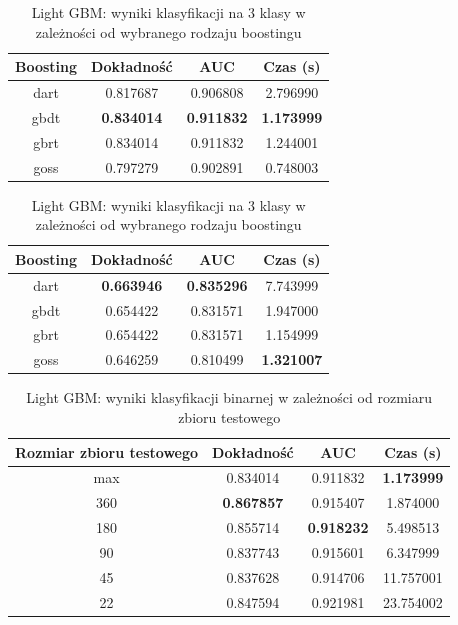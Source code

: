\documentclass[a4paper, twoside, 11pt, openright]{article}
\begin{document}
\begin{table}[H]
    \centering
    \begin{tabular}{|c|c|c|c|}
    \hline
        \textbf{Boosting} & \textbf{Dokładność} & \textbf{AUC} & \textbf{Czas (s)} \\ \hline
dart     &  0.817687 &  0.906808 &    2.796990 \\ \hline
gbdt     &  \textbf{0.834014} &  \textbf{0.911832} &    \textbf{1.173999} \\ \hline
gbrt     &  0.834014 &  0.911832 &    1.244001 \\ \hline
goss     &  0.797279 &  0.902891 &    0.748003 \\ \hline
    \end{tabular}
    \caption{Light GBM: wyniki klasyfikacji na 3 klasy w zależności od wybranego rodzaju boostingu}
    \label{tab:lgbm_boosting_binary}
\end{table}

\begin{table}[H]
    \centering
    \begin{tabular}{|c|c|c|c|}
    \hline
        \textbf{Boosting} & \textbf{Dokładność} & \textbf{AUC} & \textbf{Czas (s)} \\ \hline
dart     &  \textbf{0.663946} &  \textbf{0.835296} &    7.743999 \\ \hline
gbdt     &  0.654422 &  0.831571 &    1.947000 \\ \hline
gbrt     &  0.654422 &  0.831571 &    1.154999 \\ \hline
goss     &  0.646259 &  0.810499 &    \textbf{1.321007} \\ \hline
    \end{tabular}
    \caption{Light GBM: wyniki klasyfikacji na 3 klasy w zależności od wybranego rodzaju boostingu}
    \label{tab:lgbm_boosting_discrete}
\end{table}

\begin{table}[H]
    \centering
    \begin{tabular}{|c|c|c|c|}
    \hline
        \textbf{Rozmiar zbioru testowego} & \textbf{Dokładność} & \textbf{AUC} & \textbf{Czas (s)} \\ \hline
max    &  0.834014 &  0.911832 &  \textbf{1.173999} \\ \hline
360                         &  \textbf{0.867857} &  0.915407 &   1.874000 \\ \hline
180                         &  0.855714 &  \textbf{0.918232} &    5.498513 \\ \hline
90                         &  0.837743 &  0.915601 &    6.347999 \\ \hline
45                          &  0.837628 &  0.914706 &   11.757001 \\ \hline
22                          &  0.847594 &  0.921981 &   23.754002 \\ \hline
    \end{tabular}
    \caption{Light GBM: wyniki klasyfikacji binarnej w zależności od rozmiaru zbioru testowego}
    \label{tab:lgbm_walk_forward_binary}
\end{table}
\end{document}
